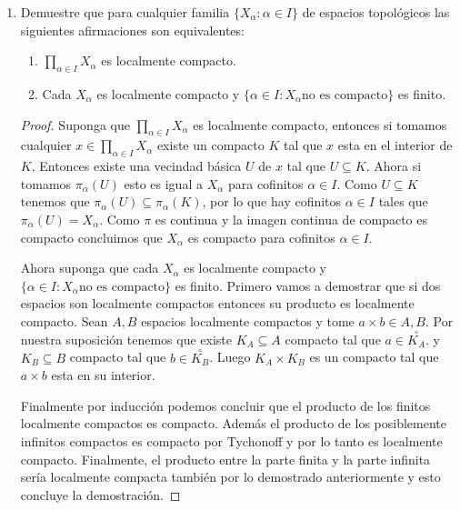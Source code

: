 \documentclass[letter,twoside,12pt]{article}
\begin{document}
\begin{enumerate}
\begin{proof}
\end{proof}

\item Demuestre que para cualquier familia $ \{X_\alpha: \alpha \in I \} $ de espacios topológicos las siguientes afirmaciones son equivalentes:

\begin{enumerate}
\item $ \prod_{\alpha \in I} X_\alpha $ es localmente compacto.

\item Cada $ X_\alpha $ es localmente compacto y $  \{ \alpha \in I: X_\alpha \text{no es compacto} \} $ es finito.
\end{enumerate}

\begin{proof}
Suponga que $ \prod_{\alpha \in I} X_\alpha $ es localmente compacto, entonces si tomamos cualquier $ x \in \prod_{\alpha \in I} X_\alpha $ existe un compacto $ K $ tal que $ x $ esta en el interior de $ K $. Entonces existe una vecindad básica $ U $ de $ x $ tal que $ U \subseteq K $. Ahora si tomamos $ \pi_\alpha(U) $ esto es igual a $ X_\alpha $ para cofinitos $ \alpha \in I $. Como $ U \subseteq K $ tenemos que $ \pi_\alpha(U) \subseteq \pi_\alpha(K) $, por lo que hay cofinitos $ \alpha \in I $ tales que $ \pi_\alpha(U) = X_\alpha $. Como $ \pi $ es continua y la imagen continua de compacto es compacto concluimos que $ X_\alpha $ es compacto para cofinitos $ \alpha \in I $.

Ahora suponga que cada $ X_\alpha $ es localmente compacto y $  \{ \alpha \in I: X_\alpha \text{no es compacto} \} $ es finito. Primero vamos a demostrar que si dos espacios son localmente compactos entonces su producto es localmente compacto. Sean  $ A, B $ espacios localmente compactos y tome $ a \times b \in A, B $. Por nuestra suposición tenemos que existe $ K_A \subseteq A $ compacto tal que $ a \in \overset{\circ}{K_A} $. y $ K_B \subseteq B $ compacto tal que $ b \in \overset{\circ}{K_B} $. Luego $ K_A \times K_B $ es un compacto tal que $ a \times b $ esta en su interior.

Finalmente por inducción podemos concluir que el producto de los finitos localmente compactos es compacto. Además el producto de los posiblemente infinitos compactos es compacto por Tychonoff y por lo tanto es localmente compacto. Finalmente, el producto entre la parte finita y la parte infinita sería localmente compacta también por lo demostrado anteriormente y esto concluye la demostración.
\end{proof}
\end{enumerate}
\end{document}
